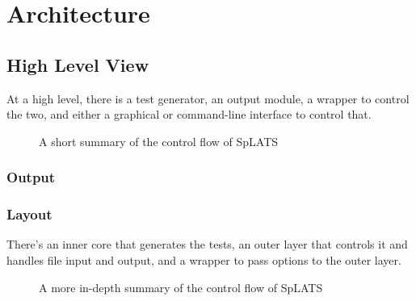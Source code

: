\chapter{Architecture}

\section{High Level View}

  At a high level, there is a test generator, an output module, a wrapper to control the two, and either a graphical or command-line interface to control that.
\begin{center}
\begin{figure}
\caption{A short summary of the control flow of SpLATS}
\end{figure}
\end{center}

  \subsection{Output}

  \subsection{Layout}
    There's an inner core that generates the tests, an outer layer that controls it and handles file input and output, and a wrapper to pass options to the outer layer.

  \begin{center}
  \begin{figure}
  
  \caption{A more in-depth summary of the control flow of SpLATS}
  \end{figure}
  \end{center}

